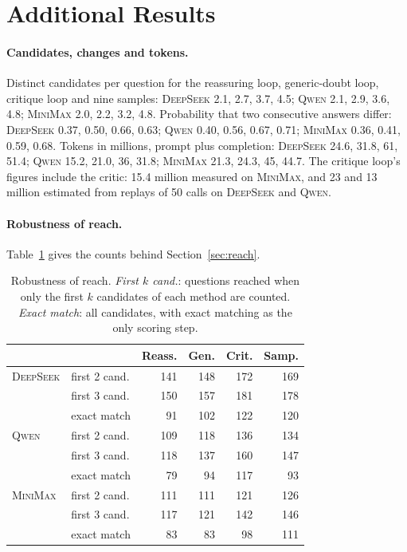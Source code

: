 \documentclass[11pt]{article}
\newcommand{\ds}{\textsc{DeepSeek}}
\newcommand{\qw}{\textsc{Qwen}}
\newcommand{\mm}{\textsc{MiniMax}}
\begin{document}
\section{Additional Results}
\label{app:more}

\paragraph{Candidates, changes and tokens.}
Distinct candidates per question for the reassuring loop, generic-doubt loop, critique loop and nine samples: \ds{} 2.1, 2.7, 3.7, 4.5; \qw{} 2.1, 2.9, 3.6, 4.8; \mm{} 2.0, 2.2, 3.2, 4.8.
Probability that two consecutive answers differ: \ds{} 0.37, 0.50, 0.66, 0.63; \qw{} 0.40, 0.56, 0.67, 0.71; \mm{} 0.36, 0.41, 0.59, 0.68.
Tokens in millions, prompt plus completion: \ds{} 24.6, 31.8, 61, 51.4; \qw{} 15.2, 21.0, 36, 31.8; \mm{} 21.3, 24.3, 45, 44.7.
The critique loop's figures include the critic: 15.4 million measured on \mm, and 23 and 13 million estimated from replays of 50 calls on \ds{} and \qw.

\paragraph{Robustness of reach.}
Table~\ref{tab:robust} gives the counts behind Section~\ref{sec:reach}.

\begin{table}[h]
\centering
\small
\setlength{\tabcolsep}{4pt}
\begin{tabular}{@{}ll rrrr@{}}
\toprule
 & & Reass. & Gen. & Crit. & Samp. \\
\midrule
\ds & first 2 cand. & 141 & 148 & 172 & 169 \\
 & first 3 cand. & 150 & 157 & 181 & 178 \\
 & exact match & 91 & 102 & 122 & 120 \\
\qw & first 2 cand. & 109 & 118 & 136 & 134 \\
 & first 3 cand. & 118 & 137 & 160 & 147 \\
 & exact match & 79 & 94 & 117 & 93 \\
\mm & first 2 cand. & 111 & 111 & 121 & 126 \\
 & first 3 cand. & 117 & 121 & 142 & 146 \\
 & exact match & 83 & 83 & 98 & 111 \\
\bottomrule
\end{tabular}
\caption{Robustness of reach. \emph{First $k$ cand.}: questions reached when only the first $k$ candidates of each method are counted. \emph{Exact match}: all candidates, with exact matching as the only scoring step.}
\label{tab:robust}
\end{table}
\end{document}
